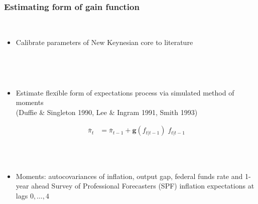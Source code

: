 \documentclass[10pt]{beamer}
\DeclareMathOperator{\E}{\mathbb{E}}
\begin{document}
\begin{frame}
	\frametitle{Estimating form of gain function}\label{estimation_general}




\


\begin{itemize}
\item Calibrate parameters of New Keynesian core to literature 

\

\

\item Estimate flexible form of expectations process via simulated method of moments \\ (Duffie \& Singleton 1990, Lee \& Ingram 1991, Smith 1993)

\begin{align}
\bar{\pi}_{t}  &=\bar{\pi}_{t-1} +\mathbf{g}(f_{t|t-1}) \; f_{t|t-1} \tag{18}
\end{align}
\

\

\item Moments: autocovariances of inflation, output gap, federal funds rate and 1-year ahead Survey of Professional Forecasters (SPF) inflation expectations at lags $0, \dots, 4$
\end{itemize}

\

\

\vfill

\hfill \hyperlink{estimation_details}{}


\end{frame}
\end{document}
